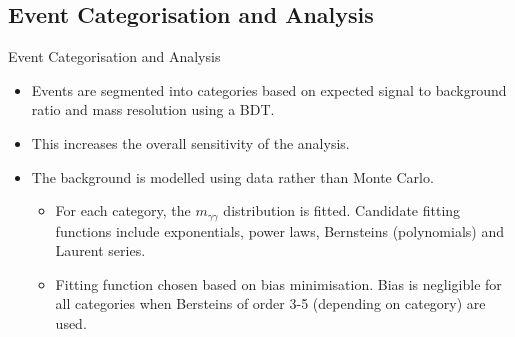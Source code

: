 \documentclass{beamer}
\begin{document}
\subsection{Event Categorisation and Analysis}

\begin{frame}{Event Categorisation and Analysis}
\begin{itemize}
\vfill \item Events are segmented into categories based on expected signal to background ratio and mass resolution using a BDT.
\vfill \item This increases the overall sensitivity of the analysis.
\vfill \item The background is modelled using data rather than Monte Carlo.
\vspace{5px}
\begin{itemize}
\pause \vfill \item For each category, the $m_{\gamma\gamma}$ distribution is fitted. Candidate fitting functions include exponentials, power laws, Bernsteins (polynomials) and Laurent series. 
\pause \vfill \item Fitting function chosen based on bias minimisation. Bias is negligible for all categories when Bersteins of order 3-5 (depending on category) are used.
\end{itemize}

\end{itemize}
\end{frame}
\end{document}
